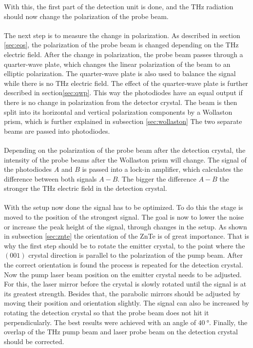 With this, the first part of the detection unit is done, and the $\si{\tera\hertz}$ radiation should now change the polarization of the probe beam.
\\\\
The next step is to measure the change in polarization.
As described in section \ref{sec:eos}, the polarization of the probe beam is changed depending on the $\si{\tera\hertz}$ electric field.
After the change in polarization, the probe beam passes through a quarter-wave plate, which changes the linear polarization of the beam to an elliptic polarization.
The quarter-wave plate is also used to balance the signal while there is no $\si{\tera\hertz}$ electric field.
The effect of the quarter-wave plate is further described in section\ref{sec:qwp}.
This way the photodiodes have an equal output if there is no change in polarization from the detector crystal.
The beam is then split into its horizontal and vertical polarization components by a Wollaston prism, which is further explained in subsection \ref{sec:wollaston}
The two separate beams are passed into photodiodes.
\\\\
Depending on the polarization of the probe beam after the detection crystal, the intensity of the probe beams after the Wollaston prism will change.
The signal of the photodiodes $A$ and $B$ is passed into a lock-in amplifier, which calculates the difference between both signals $A-B$.
The bigger the difference $A-B$ the stronger the $\si{\tera\hertz}$ electric field in the detection crystal.
\\\\
With the setup now done the signal has to be optimized.
To do this the stage is moved to the position of the strongest signal.
The goal is now to lower the noise or increase the peak height of the signal, through changes in the setup.
As shown in subsection \ref{sec:znte} the orientation of the ZnTe is of great importance.
That is why the first step should be to rotate the emitter crystal, to the point where the $(001)$ crystal direction is parallel to the polarization of the pump beam.
After the correct orientation is found the process is repeated for the detection crystal.
Now the pump laser beam position on the emitter crystal needs to be adjusted.
For this, the laser mirror before the crystal is slowly rotated until the signal is at its greatest strength.
Besides that, the parabolic mirrors should be adjusted by moving their position and orientation slightly.
The signal can also be increased by rotating the detection crystal so that the probe beam does not hit it perpendicularly.
The best results were achieved with an angle of $\SI{40}{\degree}$.
Finally, the overlap of the $\si{\tera\hertz}$ pump beam and laser probe beam on the detection crystal should be corrected.


